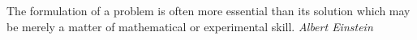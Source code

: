 \documentclass[convert=imagemagick]{standalone}
\begin{document}
\parbox[t][36pt][c]{300pt}{
The formulation of a problem is often more essential than its solution
which may be merely a matter of mathematical or experimental skill.
\textit{Albert Einstein}
}
\end{document}
